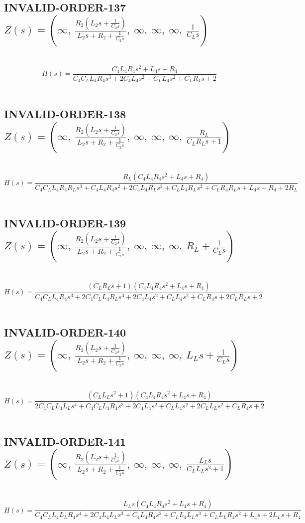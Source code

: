 \documentclass{article}
\begin{document}
\subsection{INVALID-ORDER-137 $Z(s) = \left( \infty, \  \frac{R_{2} \left(L_{2} s + \frac{1}{C_{2} s}\right)}{L_{2} s + R_{2} + \frac{1}{C_{2} s}}, \  \infty, \  \infty, \  \infty, \  \frac{1}{C_{L} s}\right)$ } \ 
\textbf{\[H(s) = \frac{C_{4} L_{4} R_{4} s^{2} + L_{4} s + R_{4}}{C_{4} C_{L} L_{4} R_{4} s^{3} + 2 C_{4} L_{4} s^{2} + C_{L} L_{4} s^{2} + C_{L} R_{4} s + 2}\] } \ 
\subsection{INVALID-ORDER-138 $Z(s) = \left( \infty, \  \frac{R_{2} \left(L_{2} s + \frac{1}{C_{2} s}\right)}{L_{2} s + R_{2} + \frac{1}{C_{2} s}}, \  \infty, \  \infty, \  \infty, \  \frac{R_{L}}{C_{L} R_{L} s + 1}\right)$ } \ 
\textbf{\[H(s) = \frac{R_{L} \left(C_{4} L_{4} R_{4} s^{2} + L_{4} s + R_{4}\right)}{C_{4} C_{L} L_{4} R_{4} R_{L} s^{3} + C_{4} L_{4} R_{4} s^{2} + 2 C_{4} L_{4} R_{L} s^{2} + C_{L} L_{4} R_{L} s^{2} + C_{L} R_{4} R_{L} s + L_{4} s + R_{4} + 2 R_{L}}\] } \ 
\subsection{INVALID-ORDER-139 $Z(s) = \left( \infty, \  \frac{R_{2} \left(L_{2} s + \frac{1}{C_{2} s}\right)}{L_{2} s + R_{2} + \frac{1}{C_{2} s}}, \  \infty, \  \infty, \  \infty, \  R_{L} + \frac{1}{C_{L} s}\right)$ } \ 
\textbf{\[H(s) = \frac{\left(C_{L} R_{L} s + 1\right) \left(C_{4} L_{4} R_{4} s^{2} + L_{4} s + R_{4}\right)}{C_{4} C_{L} L_{4} R_{4} s^{3} + 2 C_{4} C_{L} L_{4} R_{L} s^{3} + 2 C_{4} L_{4} s^{2} + C_{L} L_{4} s^{2} + C_{L} R_{4} s + 2 C_{L} R_{L} s + 2}\] } \ 
\subsection{INVALID-ORDER-140 $Z(s) = \left( \infty, \  \frac{R_{2} \left(L_{2} s + \frac{1}{C_{2} s}\right)}{L_{2} s + R_{2} + \frac{1}{C_{2} s}}, \  \infty, \  \infty, \  \infty, \  L_{L} s + \frac{1}{C_{L} s}\right)$ } \ 
\textbf{\[H(s) = \frac{\left(C_{L} L_{L} s^{2} + 1\right) \left(C_{4} L_{4} R_{4} s^{2} + L_{4} s + R_{4}\right)}{2 C_{4} C_{L} L_{4} L_{L} s^{4} + C_{4} C_{L} L_{4} R_{4} s^{3} + 2 C_{4} L_{4} s^{2} + C_{L} L_{4} s^{2} + 2 C_{L} L_{L} s^{2} + C_{L} R_{4} s + 2}\] } \ 
\subsection{INVALID-ORDER-141 $Z(s) = \left( \infty, \  \frac{R_{2} \left(L_{2} s + \frac{1}{C_{2} s}\right)}{L_{2} s + R_{2} + \frac{1}{C_{2} s}}, \  \infty, \  \infty, \  \infty, \  \frac{L_{L} s}{C_{L} L_{L} s^{2} + 1}\right)$ } \ 
\textbf{\[H(s) = \frac{L_{L} s \left(C_{4} L_{4} R_{4} s^{2} + L_{4} s + R_{4}\right)}{C_{4} C_{L} L_{4} L_{L} R_{4} s^{4} + 2 C_{4} L_{4} L_{L} s^{3} + C_{4} L_{4} R_{4} s^{2} + C_{L} L_{4} L_{L} s^{3} + C_{L} L_{L} R_{4} s^{2} + L_{4} s + 2 L_{L} s + R_{4}}\] } \ 
\end{document}
